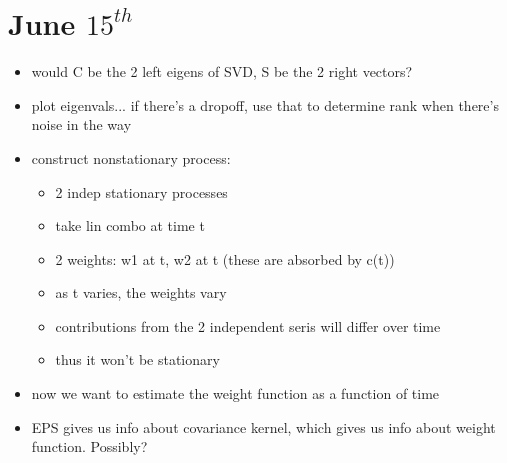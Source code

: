 \documentclass{article}
\begin{document}
\section*{June $15^{th}$}
\begin{itemize}
    \item would C be the 2 left eigens of SVD, S be the 2 right vectors?
    \item plot eigenvals... if there's a dropoff, 
        use that to determine rank when there's noise in the way
    \item construct nonstationary process:
    \begin{itemize}
        \item 2 indep stationary processes
        \item take lin  combo at time t
        \item 2 weights: w1 at t, w2 at t (these are absorbed by c(t))
        \item as t varies, the weights vary
        \item contributions from the 2 independent seris will differ over time
        \item thus it won't be stationary
    \end{itemize}
    \item now we want to estimate the weight function as a function of time
    \item  EPS gives us info about covariance kernel, which gives us info about weight function. Possibly?
\end{itemize}
\end{document}

